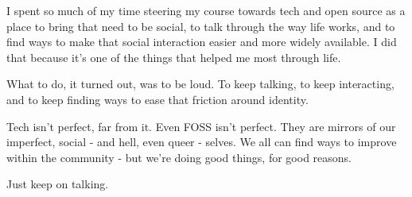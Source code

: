 \documentclass[12pt,letterpaper,oneside]{memoir}
\begin{document}
I spent so much of my time steering my course towards tech and open source as a place to bring that need to be social, to talk through the way life works, and to find ways to make that social interaction easier and more widely available.  I did that because it's one of the things that helped me most through life.

What to do, it turned out, was to be loud.  To keep talking, to keep interacting, and to keep finding ways to ease that friction around identity.

Tech isn't perfect, far from it.  Even FOSS isn't perfect.  They are mirrors of our imperfect, social - and hell, even queer - selves.  We all can find ways to improve within the community - but we're doing good things, for good reasons.

Just keep on talking.
\end{document}
